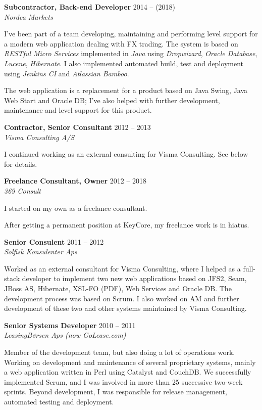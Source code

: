 \documentclass[a4paper,11pt]{article}
\begin{document}
\smallskip

\textbf{Subcontractor, Back-end Developer} \hfill 2014 -- (2018) \\
\textsl{Nordea Markets}

I’ve been part of a team developing, maintaining and performing
 level support for a modern web application dealing with FX
trading. The system is based on \textit{RESTful Micro Services}
implemented in \textit{Java} using \textit{Dropwizard}, \textit{Oracle
  Database}, \textit{Lucene}, \textit{Hibernate}. I also implemented
automated build, test and deployment using \textit{Jenkins CI} and
\textit{Atlassian Bamboo}.

The web application is a replacement for a product based on Java
Swing, Java Web Start and Oracle DB; I’ve also helped with further
development, maintenance and  level support for this product.

\smallskip

\textbf{Contractor, Senior Consultant} \hfill 2012 -- 2013 \\
\textsl{Visma Consulting A/S}

I continued working as an external consulting for Visma
Consulting. See below for details.

\smallskip

\textbf{Freelance Consultant, Owner} \hfill 2012 -- 2018 \\
\textsl{369 Consult}

I started on my own as a freelance consultant.

After getting a permanent position at KeyCore, my freelance work is in
hiatus.

\smallskip

\textbf{Senior Consulent} \hfill 2011 -- 2012 \\
\textsl{Solfisk Konsulenter Aps}

Worked as an external consultant for Visma Consulting, where I helped
as a full-stack developer to implement two new web applications based
on JFS2, Seam, JBoss AS, Hibernate, XSL-FO (PDF), Web Services and
Oracle DB. The development process was based on Scrum. I also worked
on AM and further development of these two and other systems
maintained by Visma Consulting.

\smallskip

\textbf{Senior Systems Developer} \hfill 2010 -- 2011 \\
\textsl{LeasingBørsen Aps (now GoLease.com)}

Member of the development team, but also doing a lot of operations
work. Working on development and maintenance of several proprietary
systems, mainly a web application written in Perl using Catalyst and
CouchDB. We successfully implemented Scrum, and I was involved in more
than 25 successive two-week sprints. Beyond development, I was
responsible for release management, automated testing and deployment.
\end{document}

